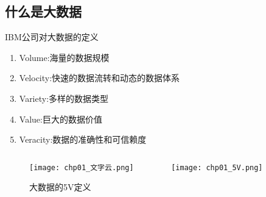 \subsection{什么是大数据}

\begin{frame}[t]{\subsecname}
\begin{goodbox}{IBM公司对大数据的定义}
\begin{enumerate}\footnotesize
    \item Volume:海量的数据规模
    \item Velocity:快速的数据流转和动态的数据体系
    \item Variety:多样的数据类型
    \item Value:巨大的数据价值
    \item Veracity:数据的准确性和可信赖度
\end{enumerate}
\end{goodbox}

\begin{figure}
\begin{columns}
  \begin{column}{.5\textwidth}
      \texttt{[image: chp01\_文字云.png]}
  \end{column}
  \begin{column}{.5\textwidth}
      \texttt{[image: chp01\_5V.png]}
  \end{column}
\end{columns}
\caption{大数据的5V定义}
\end{figure}
\end{frame}

